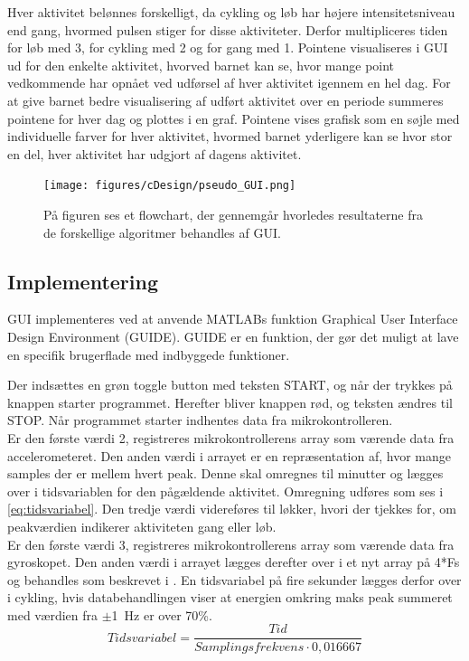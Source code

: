 Hver aktivitet belønnes forskelligt, da cykling og løb har højere intensitetsniveau end gang, hvormed pulsen stiger for disse aktiviteter. Derfor multipliceres tiden for løb med 3, for cykling med 2 og for gang med 1. Pointene visualiseres i GUI ud for den enkelte aktivitet, hvorved barnet kan se, hvor mange point vedkommende har opnået ved udførsel af hver aktivitet igennem en hel dag. For at give barnet bedre visualisering af udført aktivitet over en periode summeres pointene for hver dag og plottes i en graf. Pointene vises grafisk som en søjle med individuelle farver for hver aktivitet, hvormed barnet yderligere kan se hvor stor en del, hver aktivitet har udgjort af dagens aktivitet.  
\begin{figure}[H]
	\centering
	\texttt{[image: figures/cDesign/pseudo\_GUI.png]}
	\caption{På figuren ses et flowchart, der gennemgår hvorledes resultaterne fra de forskellige algoritmer behandles af GUI.}
	\label{fig:GUI}
\end{figure}

\subsection{Implementering}
GUI implementeres ved at anvende MATLABs funktion Graphical User Interface Design Environment (GUIDE). GUIDE er en funktion, der gør det muligt at lave en specifik brugerflade med indbyggede funktioner.

Der indsættes en grøn toggle button med teksten START, og når der trykkes på knappen starter programmet. Herefter bliver knappen rød, og teksten ændres til STOP. Når programmet starter indhentes data fra mikrokontrolleren. \\
Er den første værdi 2, registreres mikrokontrollerens array som værende data fra accelerometeret. Den anden værdi i arrayet er en repræsentation af, hvor mange samples der er mellem hvert peak. Denne skal omregnes til minutter og lægges over i tidsvariablen for den pågældende aktivitet. Omregning udføres som ses i \eqref{eq:tidsvariabel}. Den tredje værdi videreføres til løkker, hvori der tjekkes for, om peakværdien indikerer aktiviteten gang eller løb. \\
Er den første værdi 3, registreres mikrokontrollerens array som værende data fra gyroskopet. Den anden værdi i arrayet lægges derefter over i et nyt array på 4*Fs og behandles som beskrevet i . En tidsvariabel på fire sekunder lægges derfor over i cykling, hvis databehandlingen viser at energien omkring maks peak summeret med værdien fra $\pm$1~Hz er over 70\%. 
\begin{equation}
Tidsvariabel = \frac{Tid}{Samplingsfrekvens \cdot 0,016667}
\label{eq:tidsvariabel}
\end{equation}

